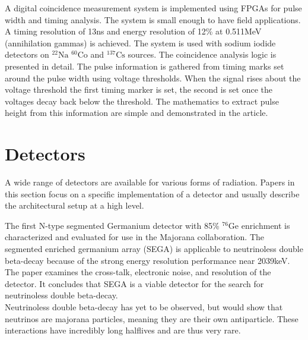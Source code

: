 \documentclass[12pt]{article}
\begin{document}
\begin{doublespacing}
{\large\textbf{\cite{Zhu2011454}}}
A digital coincidence measurement system is implemented using FPGAs for pulse width and timing analysis. The system is small enough to have field applications. A timing resolution of 13ns and energy resolution of 12\% at 0.511MeV (annihilation gammas) is achieved. The system is used with sodium iodide detectors on $^{22}\mbox{Na}$ $^{60}\mbox{Co}$ and $^{137}\mbox{Cs}$ sources. The coincidence analysis logic is presented in detail. The pulse information is gathered from timing marks set around the pulse width using voltage thresholds. When the signal rises about the voltage threshold the first timing marker is set, the second is set once the voltages decay back below the threshold. The mathematics to extract pulse height from this information are simple and demonstrated in the article.
\\[20pt]


\pagebreak
\section{Detectors}   %
A wide range of detectors are available for various forms of radiation. Papers in this section focus on a specific implementation of a detector and usually describe the architectural setup at a high level.
\\[20pt]

{\large\textbf{\cite{Leviner201466}}}

The first N-type segmented Germanium detector with 85\% $^{76}\mbox{Ge}$ enrichment is characterized and evaluated for use in the Majorana collaboration. The segmented enriched germanium array (SEGA) is applicable to neutrinoless double beta-decay because of the strong energy resolution performance near 2039keV. The paper examines the cross-talk, electronic noise, and resolution of the detector. It concludes that SEGA is a viable detector for the search for neutrinoless double beta-decay.
\\
Neutrinoless double beta-decay has yet to be observed, but would show that neutrinos are majorana particles, meaning they are their own antiparticle. These interactions have incredibly long halflives and are thus very rare.
\\[20pt]


{\large\textbf{\cite{Sangsingkeow2003183}}}


\end{doublespacing}
\end{document}

